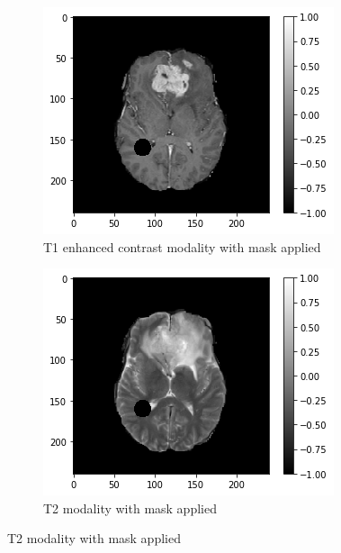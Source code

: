 \begin{figure}[H]
    \centering
    \begin{subfigure}{.33\textwidth}
        \centering
        \includegraphics[width=\linewidth]{chapters/06_hdm/images_masked/masked_1.png}
        \caption{T1 enhanced contrast modality with mask applied}
    \end{subfigure}%
    \begin{subfigure}{.33\textwidth}
        \centering
        \includegraphics[width=\linewidth]{chapters/06_hdm/images_masked/masked_2.png}
        \caption{T2 modality with mask applied}
    \end{subfigure}

\end{figure}
